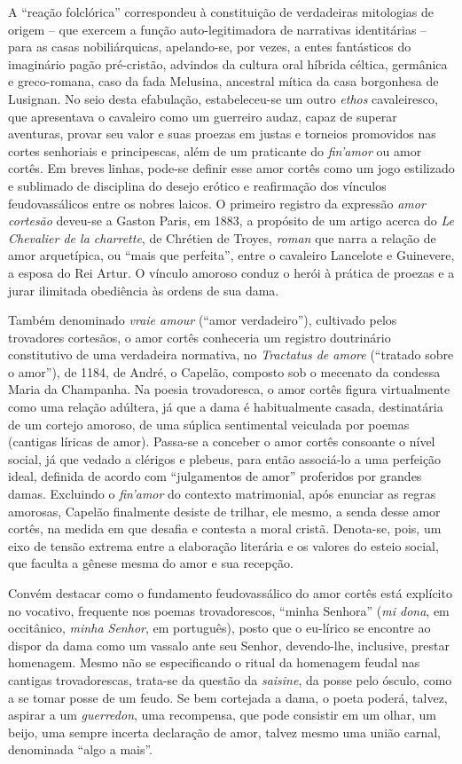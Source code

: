 A “reação folclórica” correspondeu à constituição de verdadeiras mitologias de
origem -- que exercem a função auto-legitimadora de narrativas identitárias --
para as casas nobiliárquicas, apelando-se, por vezes, a entes fantásticos do
imaginário pagão pré-cristão, advindos da cultura oral híbrida céltica,
germânica e greco-romana, caso da fada Melusina, ancestral mítica da casa
borgonhesa de Lusignan. No seio desta efabulação, estabeleceu-se um outro
\textit{ethos} cavaleiresco, que apresentava o cavaleiro como um guerreiro
audaz, capaz de superar aventuras, provar seu valor e suas proezas em justas e
torneios promovidos nas cortes senhoriais e principescas, além de um praticante
do \textit{fin’amor} ou amor cortês. Em breves linhas, pode-se definir esse
amor cortês como um jogo estilizado e sublimado de disciplina do desejo erótico
e reafirmação dos vínculos feudovassálicos entre os nobres laicos.  O primeiro
registro da expressão \textit{amor cortesão} deveu-se a Gaston Paris, em 1883,
a propósito de um artigo acerca do \textit{Le Chevalier de la charrette}, de
Chrétien de Troyes, \textit{roman} que narra a relação de amor arquetípica, ou
“mais que perfeita”, entre o cavaleiro Lancelote e Guinevere, a esposa do Rei
Artur. O vínculo amoroso conduz o herói à prática de proezas e a jurar
ilimitada obediência às ordens de sua dama.

Também denominado \textit{vraie amour} (“amor verdadeiro”), cultivado pelos
trovadores cortesãos, o amor cortês conheceria um registro doutrinário
constitutivo de uma verdadeira normativa, no \textit{Tractatus de amore
}(“tratado sobre o amor”), de 1184, de André, o Capelão, composto sob o
mecenato da condessa Maria da Champanha. Na poesia trovadoresca, o amor cortês
figura virtualmente como uma relação adúltera, já que a dama é habitualmente
casada, destinatária de um cortejo amoroso, de uma súplica sentimental
veiculada por poemas (cantigas líricas de amor). Passa-se a conceber o amor
cortês consoante o nível social, já que vedado a clérigos e plebeus, para então
associá-lo a uma perfeição ideal, definida de acordo com “julgamentos de amor”
proferidos por grandes damas. Excluindo o \textit{fin’amor} do contexto
matrimonial, após enunciar as regras amorosas, Capelão finalmente desiste de
trilhar, ele mesmo, a senda desse amor cortês, na medida em que desafia e
contesta a moral cristã. Denota-se, pois, um eixo de tensão extrema entre a
elaboração literária e os valores do esteio social, que faculta a gênese mesma
do amor e sua recepção. 

Convém destacar como o fundamento feudovassálico do amor cortês está explícito
no vocativo, frequente nos poemas trovadorescos, “minha Senhora” (\textit{mi
dona}, em occitânico, \textit{minha Senhor}, em português), posto que o
eu-lírico se encontre ao dispor da dama como um vassalo ante seu Senhor,
devendo-lhe, inclusive, prestar homenagem. Mesmo não se especificando o ritual
da homenagem feudal nas cantigas trovadorescas, trata-se da questão da
\textit{saisine}, da posse pelo ósculo, como a se tomar posse de um feudo. Se
bem cortejada a dama, o poeta poderá, talvez, aspirar a um \textit{guerredon},
uma recompensa, que pode consistir em um olhar, um beijo, uma sempre incerta
declaração de amor, talvez mesmo uma união carnal, denominada “algo a mais”.

